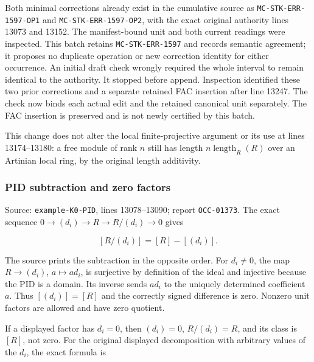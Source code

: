 Both minimal corrections already exist in the cumulative source as \texttt{MC-\AlgebraIdentifierBreak{}STK-\AlgebraIdentifierBreak{}ERR-\AlgebraIdentifierBreak{}1597-\AlgebraIdentifierBreak{}OP1} and \texttt{MC-\AlgebraIdentifierBreak{}STK-\AlgebraIdentifierBreak{}ERR-\AlgebraIdentifierBreak{}1597-\AlgebraIdentifierBreak{}OP2}, with the exact original authority lines 13073 and 13152. The manifest-bound unit and both current readings were inspected. This batch retains \texttt{MC-\AlgebraIdentifierBreak{}STK-\AlgebraIdentifierBreak{}ERR-\AlgebraIdentifierBreak{}1597} and records semantic agreement; it proposes no duplicate operation or new correction identity for either occurrence. An initial draft check wrongly required the whole interval to remain identical to the authority. It stopped before append. Inspection identified these two prior corrections and a separate retained FAC insertion after line 13247. The check now binds each actual edit and the retained canonical unit separately. The FAC insertion is preserved and is not newly certified by this batch.

This change does not alter the local finite-projective argument or its use at lines 13174--13180: a free module of rank \(n\) still has length \(n\operatorname{length}_R(R)\) over an Artinian local ring, by the original length additivity.

\subsubsection{PID subtraction and zero factors}\label{algebra-proof-001-pid-subtraction-and-zero-factors}

Source: \texttt{example-\AlgebraIdentifierBreak{}K0-\AlgebraIdentifierBreak{}PID}, lines 13078--13090; report \texttt{OCC-01373}. The exact sequence \(0\to(d_i)\to R\to R/(d_i)\to0\) gives

\[
[R/(d_i)]=[R]-[(d_i)].
\]

The source prints the subtraction in the opposite order. For \(d_i\ne0\), the map \(R\to(d_i)\), \(a\mapsto ad_i\), is surjective by definition of the ideal and injective because the PID is a domain. Its inverse sends \(ad_i\) to the uniquely determined coefficient \(a\). Thus \([(d_i)]=[R]\) and the correctly signed difference is zero. Nonzero unit factors are allowed and have zero quotient.

If a displayed factor has \(d_i=0\), then \((d_i)=0\), \(R/(d_i)=R\), and its class is \([R]\), not zero. For the original displayed decomposition with arbitrary values of the \(d_i\), the exact formula is

